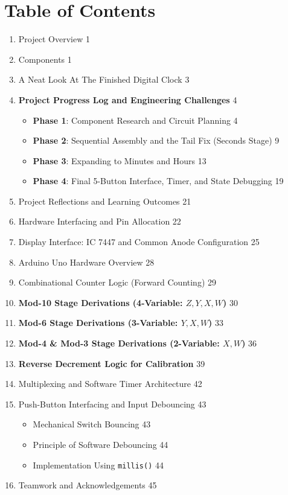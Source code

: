 \documentclass[journal,12pt,onecolumn]{IEEEtran}
\begin{document}
	
\section*{Table of Contents}


\vspace{1cm}

\begin{enumerate}
	
	\setlength{\itemsep}{1.1em} 
	
	\item Project Overview \hfill 1
	\item Components \hfill 1
	\item A Neat Look At The Finished Digital Clock \hfill 3
	\item \textbf{Project Progress Log and Engineering Challenges} \hfill 4
	\begin{itemize}
		
		\setlength{\itemsep}{0.8em} 
		
		\item \textbf{Phase 1}: Component Research and Circuit Planning \hfill 4
		\item \textbf{Phase 2}: Sequential Assembly and the Tail Fix (Seconds Stage) \hfill 9
		\item \textbf{Phase 3}: Expanding to Minutes and Hours \hfill 13
		\item \textbf{Phase 4}: Final 5-Button Interface, Timer, and State Debugging \hfill 19
	\end{itemize}
	\item Project Reflections and Learning Outcomes \hfill 21
	\item Hardware Interfacing and Pin Allocation \hfill 22
	\item Display Interface: IC 7447 and Common Anode Configuration \hfill 25
	\item Arduino Uno Hardware Overview \hfill 28
	\item Combinational Counter Logic (Forward Counting) \hfill 29
	\item \textbf{Mod-10 Stage Derivations (4-Variable: $Z, Y, X, W$)} \hfill 30
	\item \textbf{Mod-6 Stage Derivations (3-Variable: $Y, X, W$)} \hfill 33
	\item \textbf{Mod-4 \& Mod-3 Stage Derivations (2-Variable: $X, W$)} \hfill 36
	\item \textbf{Reverse Decrement Logic for Calibration} \hfill 39
	\item Multiplexing and Software Timer Architecture \hfill 42
	\item Push-Button Interfacing and Input Debouncing \hfill 43
	\begin{itemize}
		\setlength{\itemsep}{0.8em}
		\item Mechanical Switch Bouncing \hfill 43
		\item Principle of Software Debouncing \hfill 44
		\item Implementation Using \texttt{millis()} \hfill 44
	\end{itemize}
	\item Teamwork and Acknowledgements \hfill 45
\end{enumerate}
\end{document}
